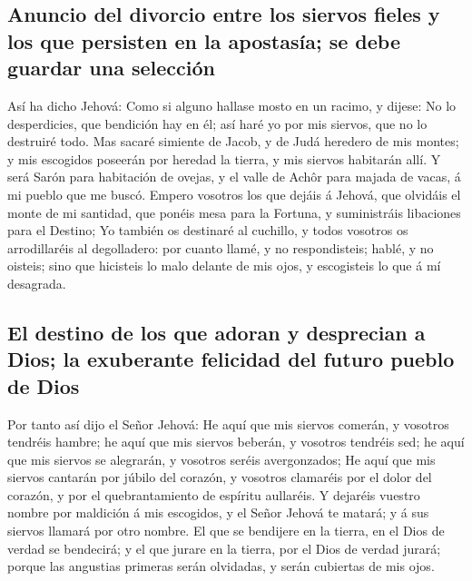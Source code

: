 \hypertarget{anuncio-del-divorcio-entre-los-siervos-fieles-y-los-que-persisten-en-la-apostasuxeda-se-debe-guardar-una-selecciuxf3n}{%
\subsection{Anuncio del divorcio entre los siervos fieles y los que
persisten en la apostasía; se debe guardar una
selección}\label{anuncio-del-divorcio-entre-los-siervos-fieles-y-los-que-persisten-en-la-apostasuxeda-se-debe-guardar-una-selecciuxf3n}}

 Así ha dicho Jehová: Como si alguno hallase mosto en un
racimo, y dijese: No lo desperdicies, que bendición hay en él; así haré
yo por mis siervos, que no lo destruiré todo.  Mas sacaré
simiente de Jacob, y de Judá heredero de mis montes; y mis escogidos
poseerán por heredad la tierra, y mis siervos habitarán allí.
 Y será Sarón para habitación de ovejas, y el valle de
Achôr para majada de vacas, á mi pueblo que me buscó. 
Empero vosotros los que dejáis á Jehová, que olvidáis el monte de mi
santidad, que ponéis mesa para la Fortuna, y suministráis libaciones
para el Destino;  Yo también os destinaré al cuchillo, y
todos vosotros os arrodillaréis al degolladero: por cuanto llamé, y no
respondisteis; hablé, y no oisteis; sino que hicisteis lo malo delante
de mis ojos, y escogisteis lo que á mí desagrada.

\hypertarget{el-destino-de-los-que-adoran-y-desprecian-a-dios-la-exuberante-felicidad-del-futuro-pueblo-de-dios}{%
\subsection{El destino de los que adoran y desprecian a Dios; la
exuberante felicidad del futuro pueblo de
Dios}\label{el-destino-de-los-que-adoran-y-desprecian-a-dios-la-exuberante-felicidad-del-futuro-pueblo-de-dios}}

 Por tanto así dijo el Señor Jehová: He aquí que mis
siervos comerán, y vosotros tendréis hambre; he aquí que mis siervos
beberán, y vosotros tendréis sed; he aquí que mis siervos se alegrarán,
y vosotros seréis avergonzados;  He aquí que mis siervos
cantarán por júbilo del corazón, y vosotros clamaréis por el dolor del
corazón, y por el quebrantamiento de espíritu aullaréis.  Y
dejaréis vuestro nombre por maldición á mis escogidos, y el Señor Jehová
te matará; y á sus siervos llamará por otro nombre.  El que
se bendijere en la tierra, en el Dios de verdad se bendecirá; y el que
jurare en la tierra, por el Dios de verdad jurará; porque las angustias
primeras serán olvidadas, y serán cubiertas de mis ojos.


